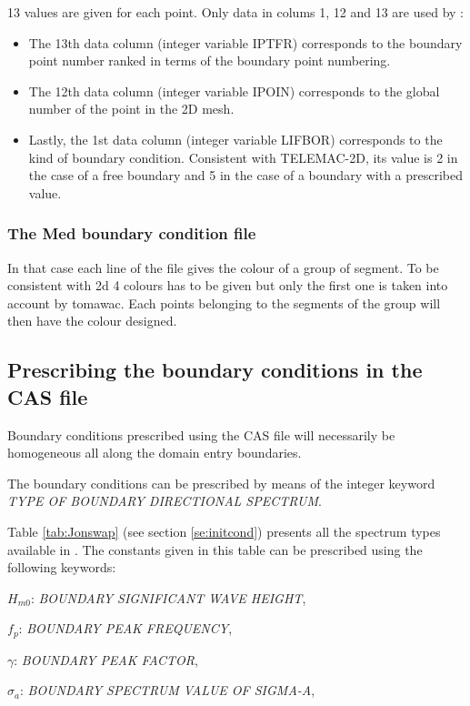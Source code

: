  13 values are given for each point. Only data in colums 1, 12 and 13 are used by \tomawac:

\begin{itemize}
\item The 13th data column (integer variable IPTFR) corresponds to the boundary point number ranked in terms of the boundary point
  numbering.
\item The 12th data column (integer variable IPOIN) corresponds to the global number of the point in the 2D mesh.
\item Lastly, the 1st data column (integer variable LIFBOR) corresponds to the kind of boundary condition. Consistent with TELEMAC-2D,
  its  value is 2 in the case of a free boundary and 5 in the case of a boundary with a prescribed value.
\end{itemize}

\subsubsection{The Med boundary condition file}
In that case each line of the file gives the colour of a group of segment. To be consistent with \telemac2d 4 colours has to be given
but only the first one is taken into account by tomawac. Each points belonging to the segments of the group will then have the colour
designed. 


\subsection{ Prescribing the boundary conditions in the CAS file}

 Boundary conditions prescribed using the CAS file will necessarily be homogeneous all along the domain entry boundaries.

 The boundary conditions can be prescribed by means of the integer keyword \textit{TYPE OF BOUNDARY DIRECTIONAL SPECTRUM}.

 Table \ref{tab:Jonswap} (see section \ref{se:initcond}) presents all the spectrum types available in \tomawac. The constants given in this table can be prescribed using the following keywords:

  $H_{m0}$: \textit{BOUNDARY SIGNIFICANT WAVE HEIGHT},

 $f_p$:  \textit{BOUNDARY PEAK FREQUENCY},

 $\gamma$:  \textit{BOUNDARY PEAK FACTOR},

 $\sigma_a$:  \textit{BOUNDARY SPECTRUM VALUE OF SIGMA-A},

